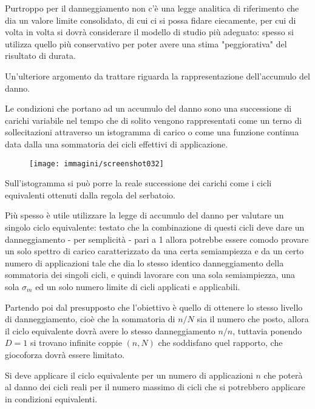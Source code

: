 \documentclass{article}
\begin{document}
\begin{adjustwidth}{2in}{}
			 Purtroppo per il danneggiamento non c'è una legge analitica di riferimento che dia un valore limite consolidato, di cui ci si possa fidare ciecamente, per cui di volta in volta si dovrà considerare il modello di studio più adeguato: spesso si utilizza quello più conservativo per poter avere una stima "peggiorativa" del risultato di durata. \newline 
			  
			 Un'ulteriore argomento da trattare riguarda la rappresentazione dell'accumulo del danno. 
			 
			 Le condizioni che portano ad un accumulo del danno sono una successione di carichi variabile nel tempo che di solito vengono rappresentati come un terno di sollecitazioni attraverso un istogramma di carico o come una funzione continua data dalla una sommatoria dei cicli effettivi di applicazione.
			 \begin{figure}[H]
			 	\centering
			 	\texttt{[image: immagini/screenshot032]}
			 	\label{fig:screenshot032}
			 \end{figure}		 
				Sull'istogramma si può porre la reale successione dei carichi come i cicli equivalenti ottenuti dalla regola del serbatoio. \newline
				
				Più spesso è utile utilizzare la legge di accumulo del danno per valutare un singolo ciclo equivalente: testato che la combinazione di questi cicli deve dare un danneggiamento - per semplicità - pari a 1 allora potrebbe essere comodo provare un solo spettro di carico caratterizzato da una certa semiampiezza e da un certo numero di applicazioni tale che dia lo stesso identico danneggiamento della sommatoria dei singoli cicli, e quindi lavorare con una sola semiampiezza, una sola $\sigma_m$ ed un solo numero limite di cicli applicati e applicabili. \newline
				
				Partendo poi dal presupposto che l'obiettivo è quello di ottenere lo stesso livello di danneggiamento, cioè che la sommatoria di $n/N$ sia il numero che posto, allora il ciclo equivalente dovrà avere lo stesso danneggiamento $n/n$, tuttavia ponendo $D=1$ si trovano infinite coppie $(n,N)$ che soddisfano quel rapporto, che giocoforza dovrà essere limitato.
				
				Si deve applicare il ciclo equivalente per un numero di applicazioni $n$ che poterà al danno dei cicli reali per il numero massimo di cicli che si potrebbero applicare in condizioni equivalenti.
				

\end{adjustwidth}
\end{document}
